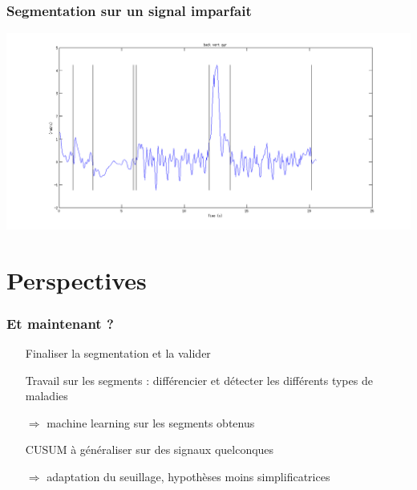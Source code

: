 \documentclass{beamer}
\begin{document}
\begin{frame}
	\frametitle{Segmentation sur un signal imparfait}
	\hspace*{-2.8cm}\includegraphics[scale=0.4]{errorexamplecusum}
\end{frame}

\section{Perspectives}

\begin{frame}
	\frametitle{Et maintenant ?}
	\begin{itemize}
		\item[Finaliser] la segmentation et la valider
		\vspace*{1cm}
		\item[Travail] sur les segments : différencier et détecter les différents types de maladies
		\item[$\Longrightarrow$] machine learning sur les segments obtenus
		\vspace*{1cm}
		\item[CUSUM] à généraliser sur des signaux quelconques
		\item[$\Longrightarrow$] adaptation du seuillage, hypothèses moins simplificatrices
	\end{itemize}
\end{frame}
\end{document}
